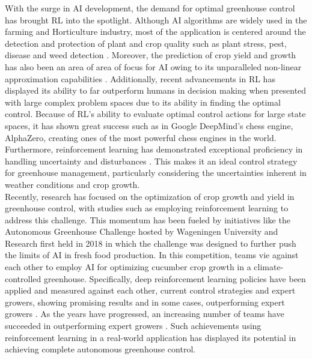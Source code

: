 With the surge in AI development, the demand for optimal greenhouse control has brought RL into the spotlight. Although AI algorithms are widely used in the farming and Horticulture industry, most of the application is centered around the detection and protection of plant and crop quality such as plant stress, pest, disease and weed detection \cite{hemmingCherryTomatoProduction2020}. Moreover, the prediction of crop yield and growth has also been an area of area of focus for AI owing to its unparalleled non-linear approximation capabilities \cite{gongDeepLearningBased2021}. Additionally, recent advancements in RL has displayed its ability to far outperform humans in decision making when presented with large complex problem spaces \cite{bonsaiWhyReinforcementLearning2017} due to its ability in finding the optimal control. Because of RL's ability to evaluate optimal control actions for large state spaces, it has shown great success such as in Google DeepMind's chess engine, AlphaZero, creating ones of the most powerful chess engines in the world. Furthermore, reinforcement learning has demonstrated exceptional proficiency in handling uncertainty and disturbances \cite{daaboulUncertaintyPredictionModelbased2020}. This makes it an ideal control strategy for greenhouse management, particularly considering the uncertainties inherent in weather conditions and crop growth. \\

Recently, research has focused on the optimization of crop growth and yield in greenhouse control, with studies such as \cite{ajagekarDeepReinforcementLearning2022,wangDeepReinforcementLearning2020,ajagekarEnergyefficientAIbasedControl2023,decardi-nelsonbenjaminImprovingResourceUse2023,zhangRobustModelbasedReinforcement2021,jansenOptimalControlLettuce2023,vanmourikPlantPerformancePrecision2023} employing reinforcement learning to address this challenge. This momentum has been fueled by initiatives like the Autonomous Greenhouse Challenge hosted by Wageningen University and Research first held in 2018 in which the challenge was designed to further push the limits of AI in fresh food production. In this competition, teams vie against each other to employ AI for optimizing cucumber crop growth in a climate-controlled greenhouse. Specifically, deep reinforcement learning policies have been applied and measured against each other, current control strategies and expert growers, showing promising results and in some cases, outperforming expert growers \cite{vandenbemdRobustDeepReinforcement,wangDeepReinforcementLearning2020}. As the years have progressed, an increasing number of teams have succeeded in outperforming expert growers \cite{vandenbemdRobustDeepReinforcement,hemmingCherryTomatoProduction2020}. Such achievements using reinforcement learning in a real-world application has displayed its potential in achieving complete autonomous greenhouse control.

